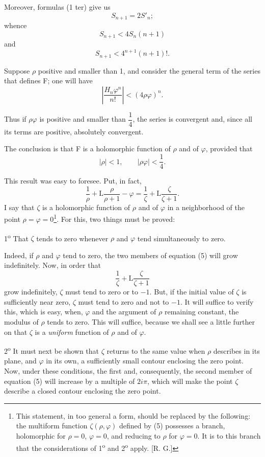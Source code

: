 \documentclass[11pt]{article}
\begin{document}
Moreover, formulas (1 ter) give us
\[
S_{n+1}=2S'_n;
\]
whence
\[
S_{n+1}<4S_n(n+1)
\]
and
\[
S_{n+1}<4^{n+1}(n+1)!.
\]

Suppose $\rho$ positive and smaller than 1, and consider the general term of the series that defines F; one will have
\[
\left|\frac{H_n\varphi^n}{n!}\right|<(4\rho\varphi)^n.
\]

Thus if $\rho\varphi$ is positive and smaller than $\dfrac14$, the series is convergent and, since all its terms are positive, absolutely convergent.

The conclusion is that F is a holomorphic function of $\rho$ and of $\varphi$, provided that
\[
|\rho|<1,
\qquad
|\rho\varphi|<\frac14.
\]

This result was easy to foresee. Put, in fact,
\begin{equation}\tag{5}
\frac1\rho+\mathrm L\frac{\rho}{\rho+1}-\varphi
=\frac1\zeta+\mathrm L\frac{\zeta}{\zeta+1}.
\end{equation}
I say that $\zeta$ is a holomorphic function of $\rho$ and of $\varphi$ in a neighborhood of the point $\rho=\varphi=0$\footnote{This statement, in too general a form, should be replaced by the following: the multiform function $\zeta(\rho,\varphi)$ defined by (5) possesses a branch, holomorphic for $\rho=0$, $\varphi=0$, and reducing to $\rho$ for $\varphi=0$. It is to this branch that the considerations of 1\textsuperscript{o} and 2\textsuperscript{o} apply. [R. G.]}. For this, two things must be proved:

1\textsuperscript{o} That $\zeta$ tends to zero whenever $\rho$ and $\varphi$ tend simultaneously to zero.

Indeed, if $\rho$ and $\varphi$ tend to zero, the two members of equation (5) will grow indefinitely. Now, in order that
\[
\frac1\zeta+\mathrm L\frac{\zeta}{\zeta+1}
\]
grow indefinitely, $\zeta$ must tend to zero or to $-1$. But, if the initial value of $\zeta$ is sufficiently near zero, $\zeta$ must tend to zero and not to $-1$. It will suffice to verify this, which is easy, when, $\varphi$ and the argument of $\rho$ remaining constant, the modulus of $\rho$ tends to zero. This will suffice, because we shall see a little further on that $\zeta$ is a \emph{uniform} function of $\rho$ and of $\varphi$.

2\textsuperscript{o} It must next be shown that $\zeta$ returns to the same value when $\rho$ describes in its plane, and $\varphi$ in its own, a sufficiently small contour enclosing the zero point. Now, under these conditions, the first and, consequently, the second member of equation (5) will increase by a multiple of $2i\pi$, which will make the point $\zeta$ describe a closed contour enclosing the zero point.
\end{document}
